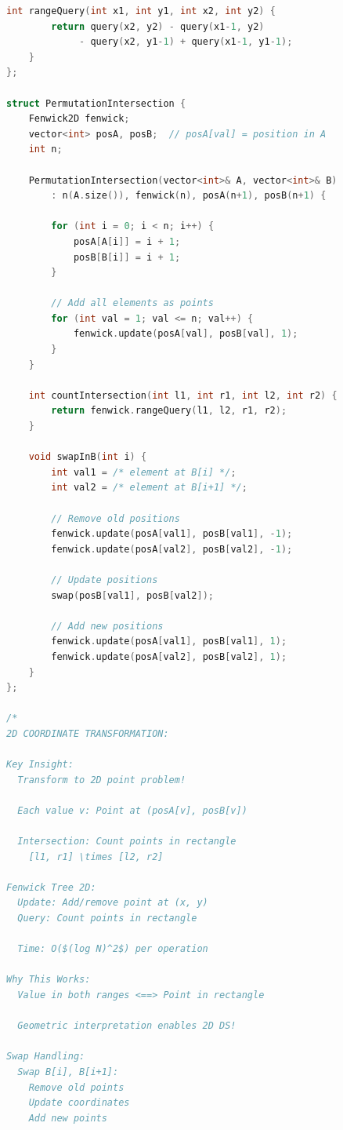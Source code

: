 \documentclass[11pt,a4paper,oneside]{book}
\begin{document}
\begin{lstlisting}[language=C++, caption=10+ COMPLETE DETAILED SOLUTIONS]
    int rangeQuery(int x1, int y1, int x2, int y2) {
        return query(x2, y2) - query(x1-1, y2) 
             - query(x2, y1-1) + query(x1-1, y1-1);
    }
};

struct PermutationIntersection {
    Fenwick2D fenwick;
    vector<int> posA, posB;  // posA[val] = position in A
    int n;
    
    PermutationIntersection(vector<int>& A, vector<int>& B) 
        : n(A.size()), fenwick(n), posA(n+1), posB(n+1) {
        
        for (int i = 0; i < n; i++) {
            posA[A[i]] = i + 1;
            posB[B[i]] = i + 1;
        }
        
        // Add all elements as points
        for (int val = 1; val <= n; val++) {
            fenwick.update(posA[val], posB[val], 1);
        }
    }
    
    int countIntersection(int l1, int r1, int l2, int r2) {
        return fenwick.rangeQuery(l1, l2, r1, r2);
    }
    
    void swapInB(int i) {
        int val1 = /* element at B[i] */;
        int val2 = /* element at B[i+1] */;
        
        // Remove old positions
        fenwick.update(posA[val1], posB[val1], -1);
        fenwick.update(posA[val2], posB[val2], -1);
        
        // Update positions
        swap(posB[val1], posB[val2]);
        
        // Add new positions
        fenwick.update(posA[val1], posB[val1], 1);
        fenwick.update(posA[val2], posB[val2], 1);
    }
};

/*
2D COORDINATE TRANSFORMATION:

Key Insight:
  Transform to 2D point problem!
  
  Each value v: Point at (posA[v], posB[v])
  
  Intersection: Count points in rectangle
    [l1, r1] \times [l2, r2]

Fenwick Tree 2D:
  Update: Add/remove point at (x, y)
  Query: Count points in rectangle
  
  Time: O($(log N)^2$) per operation

Why This Works:
  Value in both ranges <==> Point in rectangle
  
  Geometric interpretation enables 2D DS!

Swap Handling:
  Swap B[i], B[i+1]:
    Remove old points
    Update coordinates
    Add new points
  

\end{lstlisting}
\end{document}

